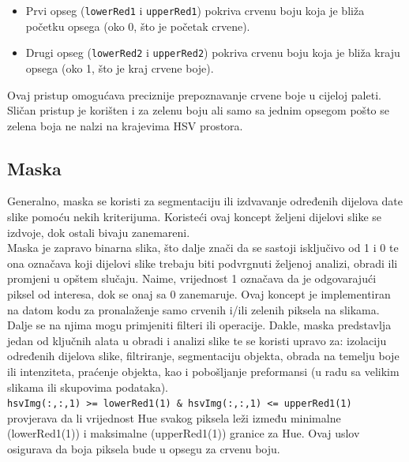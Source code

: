 \documentclass[a4paper,12pt]{article}
\begin{document}
\begin{itemize}
    \item Prvi opseg (\texttt{lowerRed1} i \texttt{upperRed1}) pokriva crvenu boju koja je bliža početku opsega (oko 0, što je početak crvene).
    \item Drugi opseg (\texttt{lowerRed2} i \texttt{upperRed2}) pokriva crvenu boju koja je bliža kraju opsega (oko 1, što je kraj crvene boje).
\end{itemize}
Ovaj pristup omogućava preciznije prepoznavanje crvene boje u cijeloj paleti. 
Sličan pristup je korišten i za zelenu boju ali samo sa jednim opsegom pošto se zelena boja ne nalzi na krajevima HSV prostora.



\subsection{Maska}
Generalno, maska se koristi za segmentaciju ili izdvavanje određenih dijelova date slike pomoću nekih kriterijuma.
Koristeći ovaj koncept željeni dijelovi slike se izdvoje, dok ostali bivaju zanemareni. \\

Maska je zapravo binarna slika, što dalje znači da se sastoji isključivo od 1 i 0 te ona označava koji dijelovi slike trebaju biti podvrgnuti željenoj analizi, obradi ili promjeni u opštem slučaju. 
Naime, vrijednost 1 označava da je odgovarajući piksel od interesa, dok se onaj sa 0 zanemaruje. 
Ovaj koncept je implementiran na datom kodu za pronalaženje samo crvenih i/ili zelenih piksela na slikama. \\

Dalje se na njima mogu primjeniti filteri ili operacije. 
Dakle, maska predstavlja jedan od ključnih alata u obradi i analizi slike te se koristi upravo za: izolaciju određenih dijelova slike, filtriranje, segmentaciju objekta, obrada na temelju boje ili intenziteta, praćenje objekta, kao i pobošljanje preformansi (u radu sa velikim slikama ili skupovima podataka).\\





\noindent \texttt{hsvImg(:,:,1) >= lowerRed1(1) \& hsvImg(:,:,1) <= upperRed1(1)} provjerava da li vrijednost Hue svakog piksela leži između minimalne (lowerRed1(1)) i maksimalne (upperRed1(1)) granice za Hue. 
Ovaj uslov osigurava da boja piksela bude u opsegu za crvenu boju.\\
\end{document}
